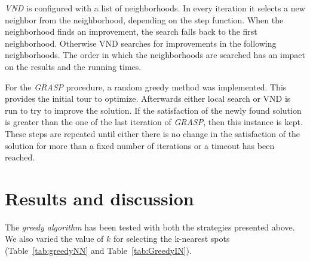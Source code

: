 \documentclass{article}
\begin{document}
\emph{VND} is configured with a list of neighborhoods. In every iteration it selects a new neighbor from the neighborhood, depending on the
step function. When the neighborhood finds an improvement, the search falls back to the first neighborhood. Otherwise VND searches for improvements in the following neighborhoods.
The order in which the neighborhoods are searched has an impact on the results and the running times.

For the \emph{GRASP} procedure, a random greedy method was implemented. This provides the initial tour to optimize. Afterwards either local
search or VND is run to try to improve the solution. If the satisfaction of the newly found solution is greater than the one of the last
iteration of \emph{GRASP}, then this instance is kept. These steps are repeated until either there is no change in the satisfaction of the
solution for more than a fixed number of iterations or a timeout has been reached.  





\section{Results and discussion}


The \emph{greedy algorithm} has been tested with both the strategies presented above. 
We also varied the value of $k$ for selecting the k-nearest spots (Table~\ref{tab:greedyNN} and Table~\ref{tab:GreedyIN}).
\medskip
\end{document}
